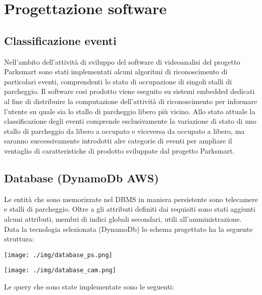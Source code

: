 \chapter{Progettazione software}


\section{Classificazione eventi}
Nell'ambito dell'attività di sviluppo del software di videoanalisi del progetto Parksmart sono stati implementati alcuni algoritmi di riconoscimento di particolari eventi, comprendenti lo stato di occupazione di singoli stalli di parcheggio. Il software cosi prodotto viene eseguito su sistemi embedded dedicati al fine di distribuire la computazione dell'attività di riconoscimento per informare l'utente su quale sia lo stallo di parcheggio libero più vicino. Allo stato attuale la classificazione degli eventi comprende esclusivamente la variazione di stato di uno stallo di parcheggio da libero a occupato e viceversa da occupato a libero, ma saranno successivamente introdotti alre categorie di eventi per ampliare il ventaglio di caratteristiche di prodotto sviluppate dal progetto Parksmart.
\vspace{5.7truecm}

\section{Database (DynamoDb AWS)}
Le entità che sono memorizzate nel DBMS in maniera persistente sono telecamere e stalli di parcheggio. Oltre a gli attributi definiti dai requisiti sono stati aggiunti alcuni attributi, membri di indici globali secondari, utili all'amministrazione. Data la tecnologia selezionata (DynamoDb) lo schema progettato ha la seguente struttura:

\vspace{0.5truecm}

\centerline{\texttt{[image: ./img/database\_ps.png]}}

\vspace{0.5truecm}

\centerline{\texttt{[image: ./img/database\_cam.png]}}

\vspace{0.5truecm}

Le query che sono state implementate sono le seguenti:


